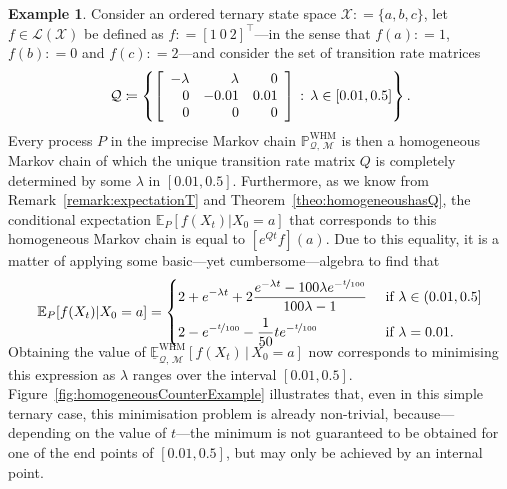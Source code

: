 \documentclass[10pt,a4paper]{paper}
\theoremstyle{definition}
\newtheorem{exmp}{Example}
\newcommand{\states}{\mathcal{X}}
\newcommand{\processes}{\mathbb{P}}
\newcommand{\whmprocesses}{\processes^{\mathrm{WHM}}}
\newcommand{\gambles}{\mathcal{L}}
\newcommand{\gamblesX}{\gambles(\states)}
\newcommand{\rateset}{\mathcal{Q}}
\newcommand{\coloneqq}{:\!=}
\begin{document}
\begin{exmp}\label{ex:homogeneousexample}
Consider an ordered ternary state space $\states\coloneqq \{a,b,c\}$,  let $f\in\gamblesX$ be defined as $f\coloneqq [1~0~2]^\top$---in the sense that $f(a)\coloneqq1$, $f(b)\coloneqq0$ and $f(c)\coloneqq2$---and consider the set of transition rate matrices
\vspace{4pt}
\begin{equation*}
\rateset \coloneqq \left\{ \left[\begin{array}{rrr}
-\lambda & \lambda & 0 \\
0 & -0.01 & 0.01 \\
0 & 0 & 0
\end{array}\right] \,:\,\lambda\in[0.01,0.5]\right\}.
\vspace{4pt}
\end{equation*}
Every process $P$ in the imprecise Markov chain $\whmprocesses_{\rateset,\,\mathcal{M}}$ is then a homogeneous Markov chain of which the unique transition rate matrix $Q$ is completely determined by some $\lambda$ in $[0.01,0.5]$. Furthermore, as we know from Remark~\ref{remark:expectationT} and Theorem~\ref{theo:homogeneoushasQ}, the conditional expectation $\mathbb{E}_P[f(X_t)\vert X_0=a]$ that corresponds to this homogeneous Markov chain is equal to $[e^{Q t}f](a)$. Due to this equality, it is a matter of applying some basic---yet cumbersome---algebra to find that 
\begin{align*}
\mathbb{E}_P[f(X_t)\vert X_0=a]
=
\begin{cases}
\displaystyle
2+e^{-\lambda t}+2\frac{e^{-\lambda t}-100\lambda e^{-\nicefrac{t}{100}}}{100\lambda-1}&\text{ if $\lambda\in(0.01,0.5]$}\\[8pt]
\displaystyle
2-e^{-\nicefrac{t}{100}}-\frac{1}{50}te^{-\nicefrac{t}{100}}&\text{ if $\lambda=0.01$.}
\end{cases}\\[-10pt]
\end{align*}
Obtaining the value of $\underline{\mathbb{E}}_{\rateset,\,\mathcal{M}}^{\mathrm{WHM}}[f(X_t)\,\vert\,X_0=a]$ now corresponds to minimising this expression as $\lambda$ ranges over the interval $[0.01,0.5]$. Figure~\ref{fig:homogeneousCounterExample} illustrates that, even in this simple ternary case, this minimisation problem is already non-trivial, because---depending on the value of $t$---the minimum is not guaranteed to be obtained for one of the end points of $[0.01,0.5]$, but may 
only be achieved by an internal point. 


\end{exmp}
\end{document}
